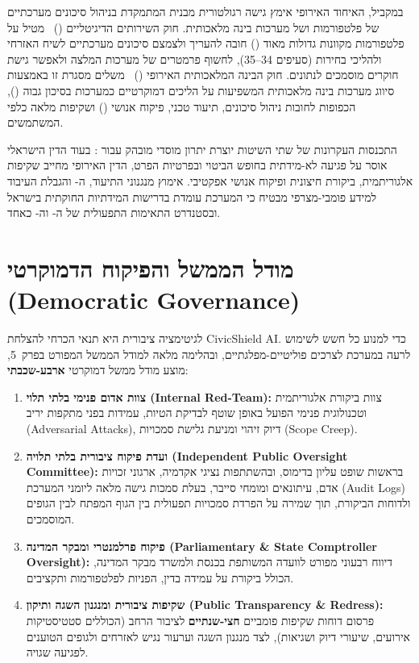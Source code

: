 במקביל, האיחוד האירופי אימץ גישה רגולטורית מבנית המתמקדת בניהול סיכונים מערכתיים של פלטפורמות ושל מערכות בינה מלאכותית. חוק השירותים הדיגיטליים ()~\cite{eu_dsa2022} מטיל על פלטפורמות מקוונות גדולות מאוד () חובה להעריך ולצמצם סיכונים מערכתיים לשיח האזרחי ולהליכי בחירות (סעיפים 34--35), לחשוף פרמטרים של מערכות המלצה ולאפשר גישת חוקרים מוסמכים לנתונים. חוק הבינה המלאכותית האירופי ()~\cite{eu_aiact2024} משלים מסגרת זו באמצעות סיווג מערכות בינה מלאכותית המשפיעות על הליכים דמוקרטיים כמערכות בסיכון גבוה (), הכפופות לחובות ניהול סיכונים, תיעוד טכני, פיקוח אנושי () ושקיפות מלאה כלפי המשתמשים.

התכנסות העקרונות של שתי השיטות יוצרת יתרון מוסדי מובהק עבור : בעוד הדין הישראלי אוסר על פגיעה לא-מידתית בחופש הביטוי ובפרטיות הפרט, הדין האירופי מחייב שקיפות אלגוריתמית, ביקורת חיצונית ופיקוח אנושי אפקטיבי. אימוץ מנגנוני התיעוד, ה- והגבלת העיבוד למידע פומבי-מצרפי מבטיח כי המערכת עומדת בדרישות המידתיות החוקתית בישראל ובסטנדרט התאימות התפעולית של ה- וה- כאחד.

\section{מודל הממשל והפיקוח הדמוקרטי (\textenglish{Democratic Governance})}
\label{sec:governance}

לגיטימציה ציבורית היא תנאי הכרחי להצלחת \textenglish{CivicShield AI}. כדי למנוע כל חשש לשימוש לרעה במערכת לצרכים פוליטיים-מפלגתיים, ובהלימה מלאה למודל הממשל המפורט בפרק~5, מוצע מודל ממשל דמוקרטי \textbf{ארבע-שכבתי}:

\begin{enumerate}
    \item \textbf{צוות אדום פנימי בלתי תלוי (\textenglish{Internal Red-Team}):} צוות ביקורת אלגוריתמית וטכנולוגית פנימי הפועל באופן שוטף לבדיקת הטיות, עמידות בפני מתקפות יריב (\textenglish{Adversarial Attacks}), דיוק זיהוי ומניעת גלישת סמכויות (\textenglish{Scope Creep}).
    \item \textbf{ועדת פיקוח ציבורית בלתי תלויה (\textenglish{Independent Public Oversight Committee}):} בראשות שופט עליון בדימוס, ובהשתתפות נציגי אקדמיה, ארגוני זכויות אדם, עיתונאים ומומחי סייבר, בעלת סמכות גישה מלאה ליומני המערכת (\textenglish{Audit Logs}) ולדוחות הביקורת, תוך שמירה על הפרדת סמכויות תפעולית בין הגוף המפתח לבין הגופים המוסמכים.
    \item \textbf{פיקוח פרלמנטרי ומבקר המדינה (\textenglish{Parliamentary \& State Comptroller Oversight}):} דיווח רבעוני מפורט לוועדה המשותפת בכנסת ולמשרד מבקר המדינה, הכולל ביקורת על עמידה בדין, הפניות לפלטפורמות ותקציבים.
    \item \textbf{שקיפות ציבורית ומנגנון השגה ותיקון (\textenglish{Public Transparency \& Redress}):} פרסום דוחות שקיפות פומביים \textbf{חצי-שנתיים} לציבור הרחב (הכוללים סטטיסטיקות אירועים, שיעורי דיוק ושגיאות), לצד מנגנון השגה וערעור נגיש לאזרחים ולגופים הטוענים לפגיעה שגויה.
\end{enumerate}

